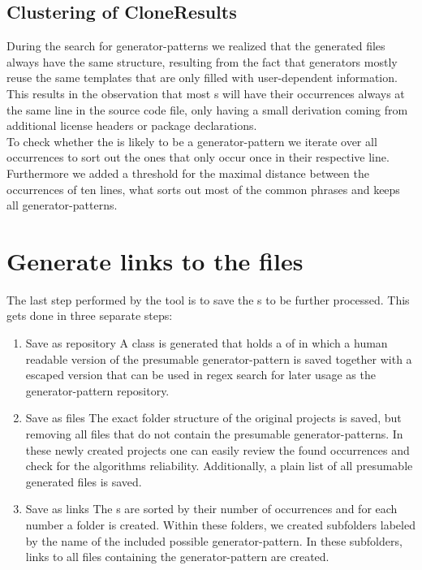 \subsection{Clustering of CloneResults}
\label{section:clustering}
During the search for generator-patterns we realized that the generated files always have the same structure, resulting from the fact that generators mostly reuse the same templates that are only filled with user-dependent information.\\
This results in the observation that most s will have their occurrences always at the same line in the source code file, only having a small derivation coming from additional license headers or package declarations.\\
To check whether the  is likely to be a generator-pattern we iterate over all occurrences to sort out the ones that only occur once in their respective line. Furthermore we added a threshold for the maximal distance between the occurrences of ten lines, what sorts out most of the common phrases and keeps all generator-patterns.

\section{Generate links to the files}
\label{section:generateLinks}
The last step performed by the tool is to save the s to be further processed. This gets done in three separate steps:
\begin{enumerate}
	\item Save as repository
		\subitem A  class is generated that holds a  of  in which a human readable version of the presumable generator-pattern is saved together with a escaped version that can be used in regex search for later usage as the generator-pattern repository.
	\item Save as files
		\subitem The exact folder structure of the original projects is saved, but removing all files that do not contain the presumable generator-patterns. In these newly created projects one can easily review the found occurrences and check for the algorithms reliability. Additionally, a plain  list of all presumable generated files is saved.
	\item Save as links
		\subitem The s are sorted by their number of occurrences and for each number a folder is created. Within these folders, we created subfolders labeled by the name of the included possible generator-pattern. In these subfolders, links to all files containing the generator-pattern are created.
\end{enumerate} 

